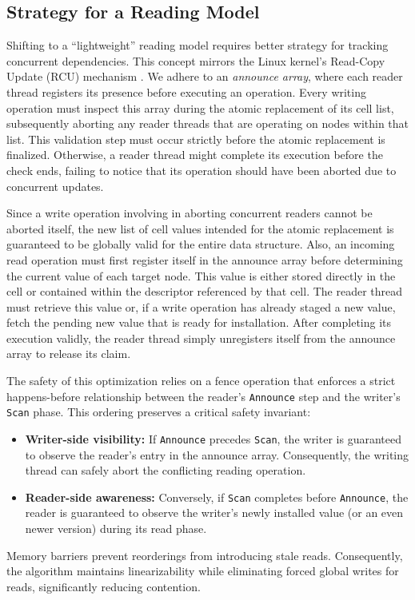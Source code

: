 \subsection{Strategy for a Reading Model}
\label{sec:strategy_for_reading_model}

Shifting to a ``lightweight'' reading model requires better strategy for tracking concurrent dependencies. This concept mirrors the Linux kernel's Read-Copy Update (RCU) mechanism \cite{RCULinux}. We adhere to an \textit{announce array}, where each reader thread registers its presence before executing an operation. Every writing operation must inspect this array during the atomic replacement of its cell list, subsequently aborting any reader threads that are operating on nodes within that list. This validation step must occur strictly before the atomic replacement is finalized. Otherwise, a reader thread might complete its execution before the check ends, failing to notice that its operation should have been aborted due to concurrent updates.

Since a write operation involving in aborting concurrent readers cannot be aborted itself, the new list of cell values intended for the atomic replacement is guaranteed to be globally valid for the entire data structure. Also, an incoming read operation must first register itself in the announce array before determining the current value of each target node. This value is either stored directly in the cell or contained within the descriptor referenced by that cell. The reader thread must retrieve this value or, if a write operation has already staged a new value, fetch the pending new value that is ready for installation. After completing its execution validly, the reader thread simply unregisters itself from the announce array to release its claim.

The safety of this optimization relies on a fence operation that enforces a strict happens-before relationship \cite{LamportClocks} between the reader’s \texttt{Announce} step and the writer’s \texttt{Scan} phase. This ordering preserves a critical safety invariant:

\begin{itemize}
    \item \textbf{Writer-side visibility:} If \texttt{Announce} precedes \texttt{Scan}, the writer is guaranteed to observe the reader’s entry in the announce array. Consequently, the writing thread can safely abort the conflicting reading operation.

    \item \textbf{Reader-side awareness:} Conversely, if \texttt{Scan} completes before \texttt{Announce}, the reader is guaranteed to observe the writer’s newly installed value (or an even newer version) during its read phase.
\end{itemize}



Memory barriers \cite{McKenneyBarriers} prevent reorderings from introducing stale reads. Consequently, the algorithm maintains linearizability while eliminating forced global writes for reads, significantly reducing contention.
